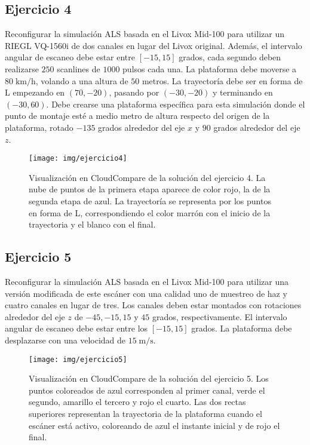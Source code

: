 \documentclass[]{article}
\begin{document}
	\subsection*{Ejercicio 4}
	Reconfigurar la simulación ALS basada en el Livox Mid-100 para utilizar un RIEGL VQ-1560i de dos canales en lugar del Livox original. Además, el intervalo angular de escaneo debe estar entre $[-15, 15]$ grados, cada segundo deben realizarse $250$ scanlines de $1000$ pulsos cada una. La plataforma debe moverse a $80\;\mathrm{km}/\mathrm{h}$, volando a una altura de $50$ metros. La trayectoría debe ser en forma de L empezando en $(70, -20)$, pasando por $(-30, -20)$ y terminando en $(-30, 60)$. Debe crearse una plataforma específica para esta simulación donde el punto de montaje esté a medio metro de altura respecto del origen de la plataforma, rotado $-135$ grados alrededor del eje $x$ y $90$ grados alrededor del eje $z$.

	\begin{figure}[htb]
		\centering
		\texttt{[image: img/ejercicio4]}
		\caption{Visualización en CloudCompare de la solución del ejercicio 4. La nube de puntos de la primera etapa aparece de color rojo, la de la segunda etapa de azul. La trayectoría se representa por los puntos en forma de L, correspondiendo el color marrón con el inicio de la trayectoria y el blanco con el final.}
		\label{fig:ejercicio4}
	\end{figure} 
	
	\pagebreak
	
	
	\subsection*{Ejercicio 5}
	Reconfigurar la simulación ALS basada en el Livox Mid-100 para utilizar una versión modificada de este escáner con una calidad uno de muestreo de haz y cuatro canales en lugar de tres. Los canales deben estar montados con rotaciones alrededor del eje $z$ de $-45, -15, 15$ y $45$ grados, respectivamente. El intervalo angular de escaneo debe estar entre los $[-15, 15]$ grados. La plataforma debe desplazarse con una velocidad de $15\;\mathrm{m}/\mathrm{s}$.
	
	\begin{figure}[htb]
		\centering
		\texttt{[image: img/ejercicio5]}
		\caption{Visualización en CloudCompare de la solución del ejercicio 5. Los puntos coloreados de azul corresponden al primer canal, verde el segundo, amarillo el tercero y rojo el cuarto. Las dos rectas superiores representan la trayectoria de la plataforma cuando el escáner está activo, coloreando de azul el instante inicial y de rojo el final.}
		\label{fig:ejercicio5}
	\end{figure} 


	
\end{document}
